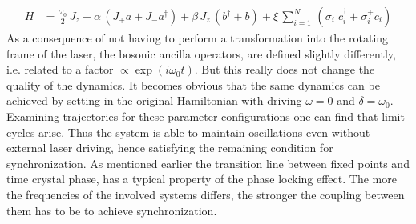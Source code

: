 \begin{align*}
    H &= \frac{\omega_0}{2}\,J_z +\alpha\,(J_+a + J_-a^\dagger)+ \beta\,J_z\,(b^\dagger+b)+\xi\,\sum_{i=1}^N\,(\sigma_i^-c_i^\dagger+\sigma_i^+c_i)
\end{align*}
As a consequence of not having to perform a transformation into the rotating frame of the laser, the bosonic ancilla operators, are defined slightly differently, i.e. related to a factor $\propto\exp(i\omega_0t)$. But this really does not change the quality of the dynamics. It becomes obvious that the same dynamics can be achieved by setting in the original Hamiltonian with driving $\omega=0$ and $\delta=\omega_0$. Examining trajectories for these parameter configurations one can find that limit cycles arise. Thus the system is able to maintain oscillations even without external laser driving, hence satisfying the remaining condition for synchronization. As mentioned earlier the transition line between fixed points and time crystal phase, has a typical property of the phase locking effect. The more the frequencies of the involved systems differs, the stronger the coupling between them has to be to achieve synchronization. 
